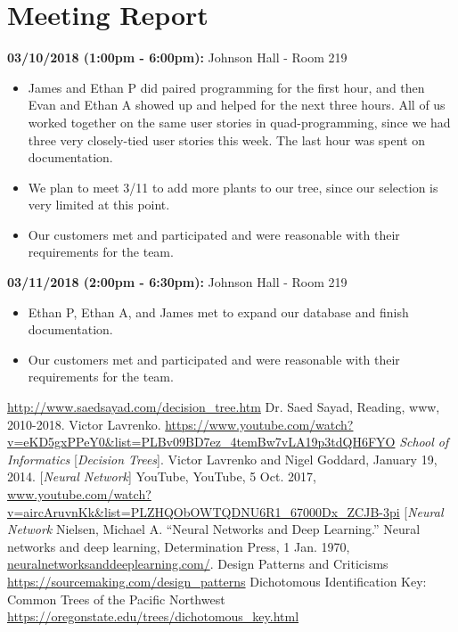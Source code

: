 \documentclass[a4paper]{article}
\begin{document}
\pagebreak
\section{Meeting Report}
\textbf{03/10/2018 (1:00pm - 6:00pm):} Johnson Hall - Room 219
\begin{itemize}
\item James and Ethan P did paired programming for the first hour, and then Evan and Ethan A showed up and helped for the next three hours. All of us worked together on the same user stories in quad-programming, since we had three very closely-tied user stories this week. The last hour was spent on documentation.
\item We plan to meet 3/11 to add more plants to our tree, since our selection is very limited at this point.
\item Our customers met and participated and were reasonable with their requirements for the team.
\end{itemize}
\textbf{03/11/2018 (2:00pm - 6:30pm):} Johnson Hall - Room 219
\begin{itemize}
\item Ethan P, Ethan A, and James met to expand our database and finish documentation.
\item Our customers met and participated and were reasonable with their requirements for the team.
\end{itemize}

\newpage %
\begin{thebibliography}{9}
\url{http://www.saedsayad.com/decision_tree.htm}
Dr. Saed Sayad, Reading, www, 2010-2018.
Victor Lavrenko.
\url{https://www.youtube.com/watch?v=eKD5gxPPeY0&list=PLBv09BD7ez_4temBw7vLA19p3tdQH6FYO}
\textit{School of Informatics} 
[\textit{Decision Trees}]. 
Victor Lavrenko and Nigel Goddard, January 19, 2014.
[\textit{Neural Network}]
YouTube, YouTube, 5 Oct. 2017, \url{www.youtube.com/watch?v=aircAruvnKk&list=PLZHQObOWTQDNU6R1_67000Dx_ZCJB-3pi}
[\textit{Neural Network}
Nielsen, Michael A. “Neural Networks and Deep Learning.” Neural networks and deep learning, Determination Press, 1 Jan. 1970,\url{ neuralnetworksanddeeplearning.com/}.
Design Patterns and Criticisms
\url{https://sourcemaking.com/design_patterns}
Dichotomous Identification Key: Common Trees of the Pacific Northwest
\url{https://oregonstate.edu/trees/dichotomous_key.html}
\end{thebibliography}
\end{document}
